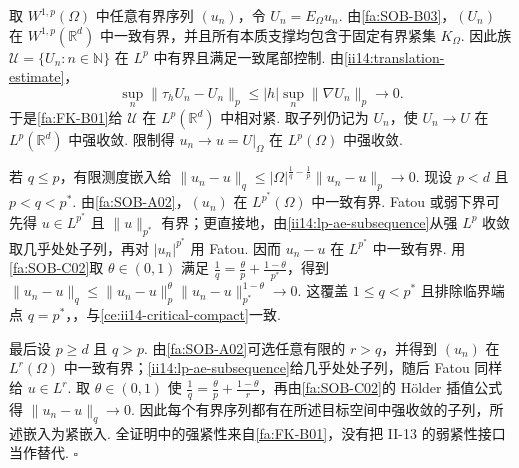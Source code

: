 \begin{FAProof}
取 \(\displaystyle W^{1,p}(\Omega)\) 中任意有界序列 \(\displaystyle(u_n)\)，令 \(\displaystyle U_n=E_\Omega u_n\). 由\autoref{fa:SOB-B03}，\(\displaystyle(U_n)\) 在 \(\displaystyle W^{1,p}(\mathbb R^d)\) 中一致有界，并且所有本质支撑均包含于固定有界紧集 \(\displaystyle K_\Omega\). 因此族 \(\displaystyle\mathcal U=\{U_n:n\in\mathbb N\}\) 在 \(\displaystyle L^p\) 中有界且满足一致尾部控制. 由\autoref{ii14:translation-estimate}，
\[
\sup_n\|\tau_hU_n-U_n\|_p
\leqslant
|h|\sup_n\|\nabla U_n\|_p
\longrightarrow0.
\]
于是\autoref{fa:FK-B01}给 \(\displaystyle\mathcal U\) 在 \(\displaystyle L^p(\mathbb R^d)\) 中相对紧. 取子列仍记为 \(\displaystyle U_n\)，使 \(\displaystyle U_n\to U\) 在 \(\displaystyle L^p(\mathbb R^d)\) 中强收敛. 限制得 \(\displaystyle u_n\to u=U|_\Omega\) 在 \(\displaystyle L^p(\Omega)\) 中强收敛.

若 \(\displaystyle q\leqslant p\)，有限测度嵌入给 \(\displaystyle \|u_n-u\|_q \leqslant |\Omega|^{\frac{1}{q}-\frac{1}{p}}\|u_n-u\|_p \longrightarrow0.\)
现设 \(\displaystyle p<d\) 且 \(\displaystyle p<q<p^*\). 由\autoref{fa:SOB-A02}，\(\displaystyle(u_n)\) 在 \(\displaystyle L^{p^*}(\Omega)\) 中一致有界. Fatou 或弱下界可先得 \(\displaystyle u\in L^{p^*}\) 且 \(\displaystyle\|u\|_{p^*}\) 有界；更直接地，由\autoref{ii14:lp-ae-subsequence}从强 \(\displaystyle L^p\) 收敛取几乎处处子列，再对 \(\displaystyle|u_n|^{p^*}\) 用 Fatou. 因而 \(\displaystyle u_n-u\) 在 \(\displaystyle L^{p^*}\) 中一致有界. 用\autoref{fa:SOB-C02}取 \(\displaystyle\theta\in(0,1)\) 满足 \(\displaystyle\frac{1}{q}=\frac{\theta}{p}+\frac{1-\theta}{p^*}\)，得到 \(\displaystyle \|u_n-u\|_q \leqslant \|u_n-u\|_p^\theta \|u_n-u\|_{p^*}^{1-\theta} \longrightarrow0.\)
这覆盖 \(\displaystyle1\leqslant q<p^*\) 且排除临界端点 \(\displaystyle q=p^*\)，，与\autoref{ce:ii14-critical-compact}一致.

最后设 \(\displaystyle p\geqslant d\) 且 \(\displaystyle q>p\). 由\autoref{fa:SOB-A02}可选任意有限的 \(\displaystyle r>q\)，并得到 \(\displaystyle(u_n)\) 在 \(\displaystyle L^r(\Omega)\) 中一致有界；\autoref{ii14:lp-ae-subsequence}给几乎处处子列，随后 Fatou 同样给 \(\displaystyle u\in L^r\). 取 \(\displaystyle\theta\in(0,1)\) 使 \(\displaystyle\frac{1}{q}=\frac{\theta}{p}+\frac{1-\theta}{r}\)，再由\autoref{fa:SOB-C02}的 Hölder 插值公式得 \(\displaystyle\|u_n-u\|_q\to0\). 因此每个有界序列都有在所述目标空间中强收敛的子列，所述嵌入为紧嵌入. 全证明中的强紧性来自\autoref{fa:FK-B01}，没有把 II-13 的弱紧性接口当作替代.
\hfill\(\square\)
\end{FAProof}

